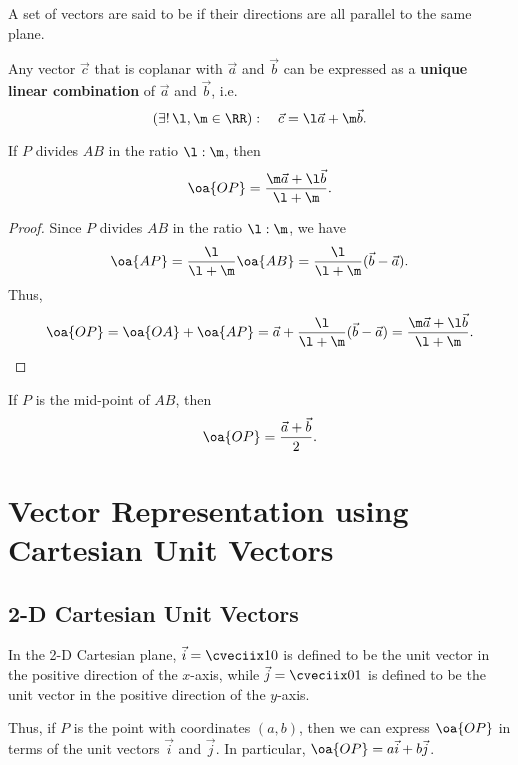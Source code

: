 \begin{definition}
    A set of vectors are said to be  if their directions are all parallel to the same plane.
\end{definition}

\begin{fact}
    Any vector $\vec c$ that is coplanar with $\vec a$ and $\vec b$ can be expressed as a \textbf{unique linear combination} of $\vec a$ and $\vec b$, i.e. \[(\exists! \, \l, \m \in \RR): \quad \vec c = \l \vec a + \m \vec b.\]
\end{fact}

\begin{theorem}
    If $P$ divides $AB$ in the ratio $\l : \m$, then \[\oa{OP} = \frac{\m \vec a + \l \vec b}{\l + \m}.\]
\end{theorem}
\begin{proof}
    Since $P$ divides $AB$ in the ratio $\l : \m$, we have \[\oa{AP} = \frac{\l}{\l + \m} \oa{AB} = \frac{\l}{\l + \m} (\vec b - \vec a).\] Thus, \[\oa{OP} = \oa{OA} + \oa{AP} = \vec a + \frac{\l}{\l + \m} (\vec b - \vec a) = \frac{\m \vec a + \l \vec b}{\l + \m}.\]
\end{proof}

\begin{corollary}
    If $P$ is the mid-point of $AB$, then \[\oa{OP} = \frac{\vec a + \vec b}{2}.\]
\end{corollary}

\section{Vector Representation using Cartesian Unit Vectors}

\subsection{2-D Cartesian Unit Vectors}

\begin{definition}
    In the 2-D Cartesian plane, $\vec i = \cveciix10$ is defined to be the unit vector in the positive direction of the $x$-axis, while $\vec j = \cveciix01$ is defined to be the unit vector in the positive direction of the $y$-axis.
\end{definition}

Thus, if $P$ is the point with coordinates $(a, b)$, then we can express $\oa{OP}$ in terms of the unit vectors $\vec i$ and $\vec j$. In particular, $\oa{OP} = a\vec i + b \vec j$.

